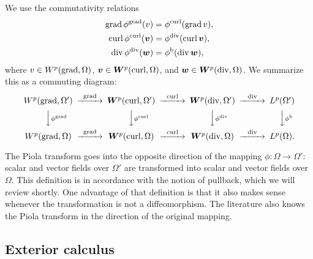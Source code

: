 \documentclass[10pt,letterpaper]{article}
\newcommand\cye[1]{%
  \protect\leavevmode
  \begingroup
    \color{red!35!yellow}%
    #1%
  \endgroup
}
\begin{document}
We use the commutativity relations 
\begin{subequations}\label{eq_piola_commute}
\begin{align}
    \operatorname{grad} \phi^{\operatorname{grad}} (v) &= \phi^{\operatorname{curl}}(\operatorname{grad} v), 
    \\
    \operatorname{curl} \phi^{\operatorname{curl}}(\bm{v}) &= \phi^{\operatorname{div}}(\operatorname{curl} \bm{v}), 
    \\
    \operatorname{div} \phi^{\operatorname{div}}(\bm{w}) &= \phi^{\rm b}(\operatorname{div} \bm{w}),
\end{align}
\end{subequations}
where $v \in W^{p}(\operatorname{grad},\Omega)$, $\bm{v} \in \bm{W}^{p}(\operatorname{curl},\Omega)$, and $\bm{w} \in \bm{W}^{p}(\operatorname{div},\Omega)$.  
We summarize this as a commuting diagram:
\begin{align*}
    \begin{CD}
        W^{p}(\grad,\Omega') @>{\grad}>> \bfW^{p}(\curl,\Omega') @>{\curl}>> \bfW^{p}(\divergence,\Omega') @>{\divergence}>> L^{p}(\Omega')
        \\
        @VV{\phi^{\grad}}V 
        @VV{\phi^{\curl}}V 
        @VV{\phi^{\divergence}}V 
        @VV{\phi^{\rm b}}V 
        \\
        W^{p}(\grad,\Omega ) @>{\grad}>> \bfW^{p}(\curl,\Omega ) @>{\curl}>> \bfW^{p}(\divergence,\Omega ) @>{\divergence}>> L^{p}(\Omega ).
    \end{CD}
\end{align*}

\begin{remark}
    The Piola transform goes into the opposite direction of the mapping $\phi : \Omega \rightarrow \Omega'$:
    scalar and vector fields over $\Omega'$ are transformed into scalar and vector fields over $\Omega$.
    This definition is in accordance with the notion of pullback, which we will review shortly. 
    One advantage of that definition is that it also makes sense whenever the transformation is not a diffeomorphism. 
    The literature also knows the Piola transform in the direction of the original mapping. 
\end{remark}


\subsection{\cye{Exterior calculus}}
\end{document}
